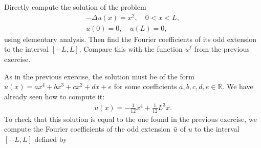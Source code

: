 \documentclass[11pt]{article}
\begin{document}
\begin{exercise}
    Directly compute the solution of the problem
    \begin{gather*}
        - \Delta u(x) = x^2, \quad 0 < x < L,
        \\
        u(0) = 0, \quad u(L) = 0,
    \end{gather*}
    using elementary analysis. Then find the Fourier coefficients of its odd extension to the interval $[-L, L]$. Compare this with the function $u^f$ from the previous exercise.
\end{exercise}
\begin{solution}
    As in the previous exercise, the solution must be of the form $u(x) = ax^4 + bx^3 + cx^2 + dx + e$ for some coefficients $a,b,c,d,e \in \mathbb R$.
    We have already seen how to compute it:
    \begin{align*}
        u(x) = -\frac{1}{12} x^4 + \frac{1}{12} L^3 x.
    \end{align*}
    To check that this solution is equal to the one found in the previous exercise, 
    we compute the Fourier coefficients of the odd extension $\Tilde u$ of $u$ to the interval $[-L,L]$ defined by

\end{solution}
\end{document}
